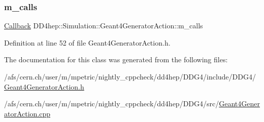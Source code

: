 \subsubsection{\texorpdfstring{m\+\_\+calls}{m\_calls}}
{\footnotesize\ttfamily \hyperlink{class_d_d4hep_1_1_callback}{Callback} D\+D4hep\+::\+Simulation\+::\+Geant4\+Generator\+Action\+::m\+\_\+calls\hspace{0.3cm}{\ttfamily [protected]}}



Definition at line 52 of file Geant4\+Generator\+Action.\+h.



The documentation for this class was generated from the following files\+:\begin{DoxyCompactItemize}
\item 
/afs/cern.\+ch/user/m/mpetric/nightly\+\_\+cppcheck/dd4hep/\+D\+D\+G4/include/\+D\+D\+G4/\hyperlink{_geant4_generator_action_8h}{Geant4\+Generator\+Action.\+h}\item 
/afs/cern.\+ch/user/m/mpetric/nightly\+\_\+cppcheck/dd4hep/\+D\+D\+G4/src/\hyperlink{_geant4_generator_action_8cpp}{Geant4\+Generator\+Action.\+cpp}\end{DoxyCompactItemize}
